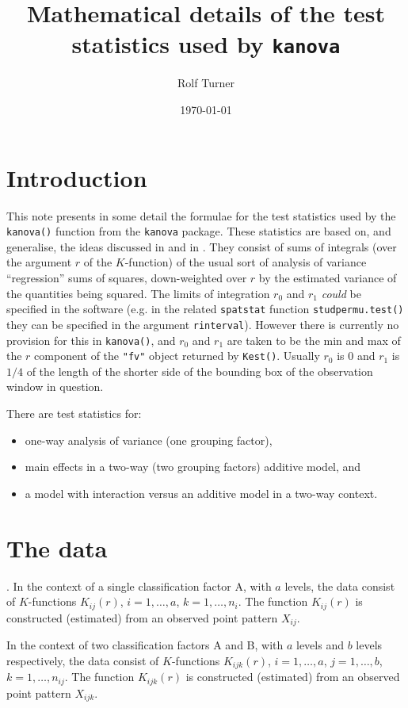 \documentclass[12pt]{article}
\begin{document}
\title{Mathematical details of the test statistics used by \texttt{kanova}}
\author{Rolf Turner}
\date{\today}
\maketitle

\section{Introduction}
\label{sec:intro}
This note presents in some detail the formulae for the test statistics
used by the \texttt{kanova()} function from the \texttt{kanova}
package.  These statistics are based on, and generalise, the
ideas discussed in \cite{DiggleEtAl2000} and in \cite{Hahn2012}.
They consist of sums of integrals (over the argument $r$ of the
$K$-function) of the usual sort of analysis of variance ``regression'' sums of
squares, down-weighted over $r$ by the estimated variance of the
quantities being squared.  The limits of integration $r_0$ and $r_1$
\emph{could} be specified in the software (e.g. in the related
\texttt{spatstat} function \texttt{studpermu.test()} they can be
specified in the argument \texttt{rinterval}).  However there is
currently no provision for this in \texttt{kanova()}, and $r_0$ and
$r_1$ are taken to be the min and max of the $r$ component of the
\texttt{"fv"} object returned by \texttt{Kest()}.   Usually $r_0$
is 0 and $r_1$ is $1/4$ of the length of the shorter side of the
bounding box of the observation window in question.

There are test statistics for:
\begin{itemize}
\item one-way analysis of variance (one grouping factor),
\item main effects in a two-way (two grouping factors) additive model, and
\item a model with interaction versus an additive model in a two-way
context.
\end{itemize}

\section{The data}.
In the context of a single classification factor A, with $a$ levels,
the data consist of $K$-functions $K_{ij}(r)$, $i = 1, \ldots,
a$, $k = 1, \ldots, n_i$.  The function $K_{ij}(r)$ is constructed
(estimated) from an observed point pattern $X_{ij}$.

In the context of two classification factors A and B, with
$a$ levels and $b$ levels respectively, the data consist of
$K$-functions $K_{ijk}(r)$, $i = 1, \ldots, a$, $j = 1, \ldots, b$,
$k = 1, \ldots, n_{ij}$.  The function $K_{ijk}(r)$ is constructed
(estimated) from an observed point pattern $X_{ijk}$.
\end{document}
